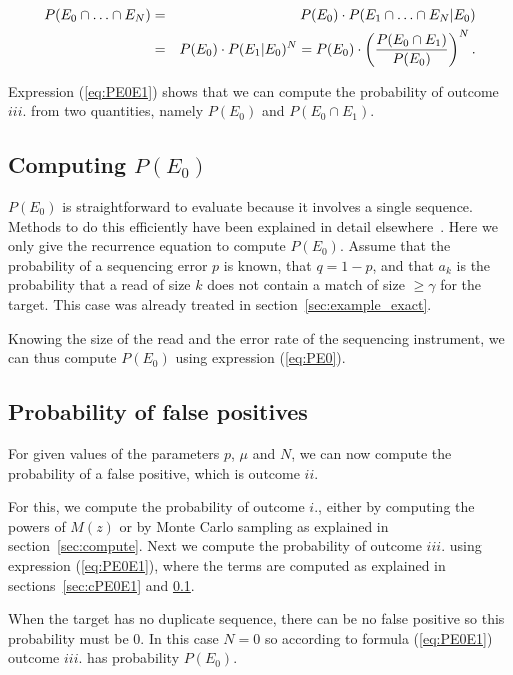 \documentclass{article}
\begin{document}
\begin{eqnarray}
\notag
P(E_0 \cap \ldots \cap E_N) &=&
  P(E_0) \cdot P(E_1 \cap \ldots \cap E_N | E_0) \\
\label{eq:PE0E1}
  &=& P(E_0) \cdot P(E_1 | E_0)^N =
  P(E_0) \cdot \left( \frac{P(E_0 \cap E_1)}{P(E_0)} \right)^N.
\end{eqnarray}

Expression (\ref{eq:PE0E1}) shows that we can compute the probability of
outcome $iii.$ from two quantities, namely $P(E_0)$ and $P(E_0 \cap E_1)$.

\subsection{Computing $P(E_0)$}
\label{sec:cPE0}

$P(E_0)$ is straightforward to evaluate because it involves a single
sequence. Methods to do this efficiently have been explained in detail
elsewhere~\cite{filion2018analytic}. Here we only give the recurrence
equation to compute $P(E_0)$. Assume that the probability of a sequencing
error $p$ is known, that $q = 1-p$, and that $a_k$ is the probability that
a read of size $k$ does not contain a match of size $\geq \gamma$ for the
target. This case was already treated in section~\ref{sec:example_exact}.

Knowing the size of the read and the error rate of the sequencing
instrument, we can thus compute $P(E_0)$ using expression (\ref{eq:PE0}).


\subsection{Probability of false positives}

For given values of the parameters $p$, $\mu$ and $N$, we can now compute
the probability of a false positive, which is outcome $ii$.

For this, we compute the probability of outcome $i.$, either by computing
the powers of $M(z)$ or by Monte Carlo sampling as explained in
section~\ref{sec:compute}. Next we compute the probability of outcome
$iii.$ using expression (\ref{eq:PE0E1}), where the terms are computed as
explained in sections~\ref{sec:cPE0E1} and \ref{sec:cPE0}.

When the target has no duplicate sequence, there can be no false positive
so this probability must be 0. In this case $N=0$ so according to formula
(\ref{eq:PE0E1}) outcome $iii.$ has probability $P(E_0)$. 
\end{document}

